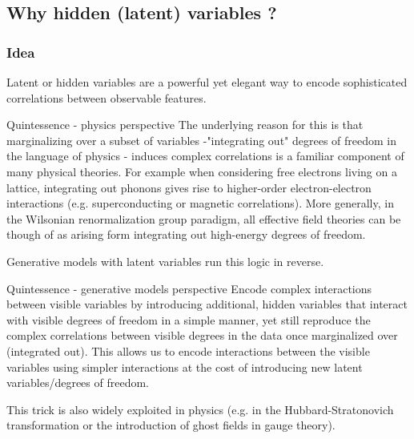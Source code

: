 \subsection{Why hidden (latent) variables ?}
\label{subsec:deepGenerativeWhy}
\subsubsection{Idea}
Latent or hidden variables are a powerful yet elegant way to encode sophisticated correlations between observable features.

\begin{mybox}{Quintessence - physics perspective}
	The underlying reason for this is that marginalizing over a subset of variables -"integrating out" degrees of freedom in the language of physics - induces complex correlations is a familiar component of many physical theories. For example when considering free electrons living on a lattice, integrating out phonons gives rise to higher-order electron-electron interactions (e.g. superconducting or magnetic correlations). More generally, in the Wilsonian renormalization group paradigm, all effective field theories can be though of as arising form integrating out high-energy degrees of freedom.
\end{mybox}
Generative models with latent variables run this logic in reverse.
\begin{mybox}{Quintessence - generative models perspective}
	Encode complex interactions between visible variables by introducing additional, hidden variables that interact with visible degrees of freedom in a simple manner, yet still reproduce the complex correlations between visible degrees in the data once marginalized over (integrated out). This allows us to encode interactions between the visible variables using simpler interactions at the cost of introducing new latent variables/degrees of freedom.
\end{mybox}
This trick is also widely exploited in physics (e.g. in the Hubbard-Stratonovich transformation or the introduction of ghost fields in gauge theory).

